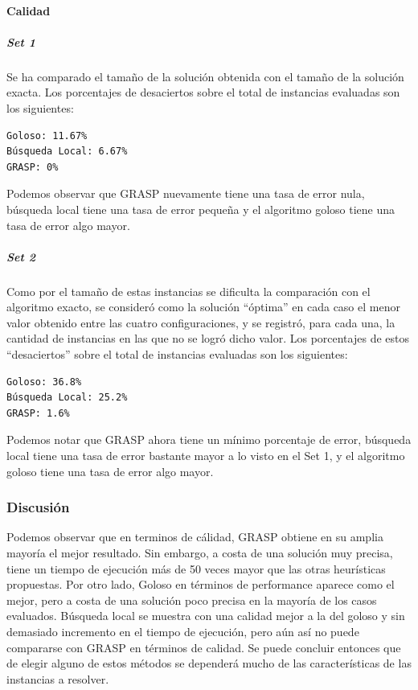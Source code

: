 \paragraph{Calidad} 

\subparagraph{Set 1} Se ha comparado el tamaño de la solución obtenida con el tamaño de la solución exacta.  Los porcentajes de desaciertos sobre el total de instancias evaluadas son los siguientes:

\begin{verbatim}
Goloso: 11.67%
Búsqueda Local: 6.67%
GRASP: 0%
\end{verbatim}

Podemos observar que GRASP nuevamente tiene una tasa de error nula, búsqueda local tiene una tasa de error pequeña y el algoritmo goloso tiene una tasa de error algo mayor.

\subparagraph{Set 2} Como por el tamaño de estas instancias se dificulta la comparación con el algoritmo exacto, se consideró como la solución ``óptima'' en cada caso el menor valor obtenido entre las cuatro configuraciones, y se registró, para cada una, la cantidad de instancias en las que no se logró dicho valor. Los porcentajes de estos ``desaciertos'' sobre el total de instancias evaluadas son los siguientes:

\begin{verbatim}
Goloso: 36.8%
Búsqueda Local: 25.2%
GRASP: 1.6%
\end{verbatim}

Podemos notar que GRASP ahora tiene un mínimo porcentaje de error, búsqueda local tiene una tasa de error bastante mayor a lo visto en el Set 1, y el algoritmo goloso tiene una tasa de error algo mayor.

\subsubsection{Discusión} 

Podemos observar que en terminos de cálidad, GRASP obtiene en su amplia mayoría el mejor resultado. Sin embargo, a costa de una solución muy precisa, tiene un tiempo de ejecución más de 50 veces mayor que las otras heurísticas propuestas.
Por otro lado, Goloso en términos de performance aparece como el mejor, pero a costa de una solución poco precisa en la mayoría de los casos evaluados.
Búsqueda local se muestra con una calidad mejor a la del goloso y sin demasiado incremento en el tiempo de ejecución, pero aún así no puede compararse con GRASP en términos de calidad.
Se puede concluir entonces que de elegir alguno de estos métodos se dependerá mucho de las características de las instancias a resolver.
